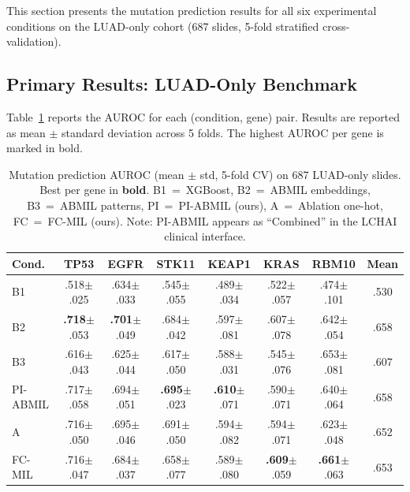 This section presents the mutation prediction results for all six experimental
conditions on the LUAD-only cohort (687 slides, 5-fold stratified
cross-validation).

\subsection{Primary Results: LUAD-Only Benchmark}
\label{sec:eval:mutation:luad}

Table~\ref{tab:mutation_luad} reports the AUROC for each (condition, gene) pair.
Results are reported as mean $\pm$ standard deviation across 5 folds.
The highest AUROC per gene is marked in bold.

\begin{table}[ht!]
\centering
\small
\caption{Mutation prediction AUROC (mean $\pm$ std, 5-fold CV) on 687
LUAD-only slides. Best per gene in \textbf{bold}.
B1~=~XGBoost, B2~=~ABMIL embeddings, B3~=~ABMIL patterns,
PI~=~PI-ABMIL (ours), A~=~Ablation one-hot, FC~=~FC-MIL (ours).
Note: PI-ABMIL appears as ``Combined'' in the LCHAI clinical interface.}
\label{tab:mutation_luad}
\begin{tabular}{l c c c c c c c}
\hline
\textbf{Cond.} & \textbf{TP53} & \textbf{EGFR} & \textbf{STK11} &
\textbf{KEAP1} & \textbf{KRAS} & \textbf{RBM10} & \textbf{Mean} \\
\hline
B1  & .518$\pm$.025 & .634$\pm$.033 & .545$\pm$.055 &
      .489$\pm$.034 & .522$\pm$.057 & .474$\pm$.101 & .530 \\
B2  & \textbf{.718}$\pm$.053 & \textbf{.701}$\pm$.049 &
      .684$\pm$.042 & .597$\pm$.081 & .607$\pm$.078 &
      .642$\pm$.054 & .658 \\
B3  & .616$\pm$.043 & .625$\pm$.044 & .617$\pm$.050 &
      .588$\pm$.031 & .545$\pm$.076 & .653$\pm$.081 & .607 \\
PI-ABMIL  & .717$\pm$.058 & .694$\pm$.051 & \textbf{.695}$\pm$.023 &
      \textbf{.610}$\pm$.071 & .590$\pm$.071 & .640$\pm$.064 & .658 \\
A   & .716$\pm$.050 & .695$\pm$.046 & .691$\pm$.050 &
      .594$\pm$.082 & .594$\pm$.071 & .623$\pm$.048 & .652 \\
FC-MIL  & .716$\pm$.047 & .684$\pm$.037 & .658$\pm$.077 &
      .589$\pm$.080 & \textbf{.609}$\pm$.059 &
      \textbf{.661}$\pm$.063 & .653 \\
\hline
\end{tabular}
\end{table}

